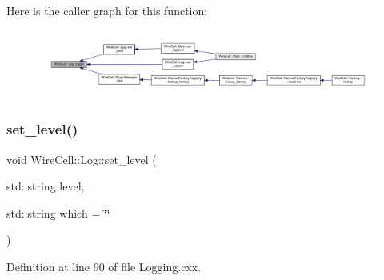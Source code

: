 Here is the caller graph for this function\+:
\nopagebreak
\begin{figure}[H]
\begin{center}
\leavevmode
\includegraphics[width=350pt]{namespace_wire_cell_1_1_log_a7675bcc4bf25b2bc66314d5c096cf676_icgraph}
\end{center}
\end{figure}
\mbox{\label{namespace_wire_cell_1_1_log_af453ddce8d810f730dca72024376727e}} 
\subsubsection{\texorpdfstring{set\+\_\+level()}{set\_level()}}
{\footnotesize\ttfamily void Wire\+Cell\+::\+Log\+::set\+\_\+level (\begin{DoxyParamCaption}\item[{std\+::string}]{level,  }\item[{std\+::string}]{which = {\ttfamily \char`\"{}\char`\"{}} }\end{DoxyParamCaption})}



Definition at line 90 of file Logging.\+cxx.

